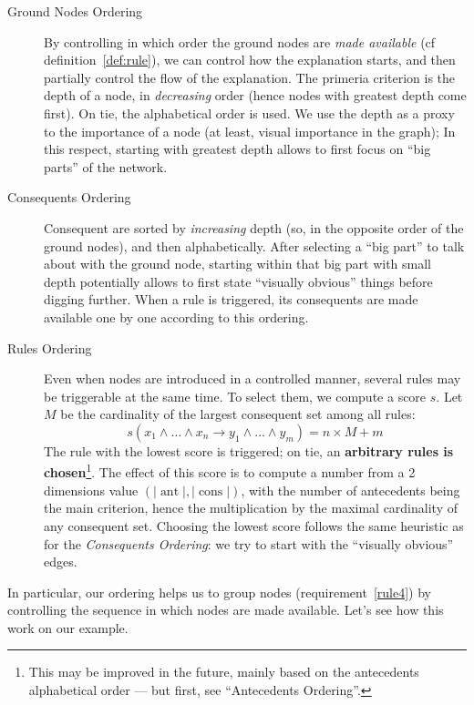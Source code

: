 \documentclass[a4paper]{article}
\newcounter{definition}[section] %
\newcommand*{\say}[1]{``{#1}''}
\newcommand*{\rar}{\rightarrow}                         %
\newcommand*{\conj}{\wedge}                             %
\DeclareMathOperator{\antecedents}{ant}
\DeclareMathOperator{\consequents}{cons}
\begin{document}
\begin{description}
  \item[Ground Nodes Ordering]
    By controlling in which order the ground nodes are \emph{made available} (cf definition~\ref{def:rule}),
    we can control how the explanation starts, and then partially control the flow of the explanation.
    The primeria criterion is the depth of a node, in \emph{decreasing} order (hence nodes with greatest depth come first).
    On tie, the alphabetical order is used.
    We use the depth as a proxy to the importance of a node (at least, visual importance in the graph);
    In this respect, starting with greatest depth allows to first focus on \say{big parts} of the network.

  \item[Consequents Ordering]
    Consequent are sorted by \emph{increasing} depth (so, in the opposite order of the ground nodes), and then
    alphabetically. After selecting a \say{big part} to talk about with the ground node, starting within that big
    part with small depth potentially allows to first state \say{visually obvious} things before digging further.
    When a rule is triggered, its consequents are made available one by one according to this ordering.

  \item[Rules Ordering]
    Even when nodes are introduced in a controlled manner, several rules may be triggerable at the same time.
    To select them, we compute a score $s$.
    Let $M$ be the cardinality of the largest consequent set among all rules:
    \[
      s(x_1 \conj \dots \conj x_n \rar y_1 \conj \dots \conj y_m) = n\times{}M+m
    \]
    The rule with the lowest score is triggered; on tie, an \textbf{arbitrary rules is chosen}\footnote{%
      This may be improved in the future, mainly based on the antecedents alphabetical order
      --- but first, see \say{Antecedents Ordering}.
    }.
    The effect of this score is to compute a number from a 2 dimensions value $(|\antecedents|, |\consequents|)$,
    with the number of antecedents being the main criterion, hence the multiplication by the maximal cardinality
    of any consequent set.
    Choosing the lowest score follows the same heuristic as for the \emph{Consequents Ordering}:
    we try to start with the \say{visually obvious} edges.
\end{description}

In particular, our ordering helps us to group nodes (requirement~\ref{rule4}) by controlling the sequence
in which nodes are made available.
Let's see how this work on our example.
\end{document}
